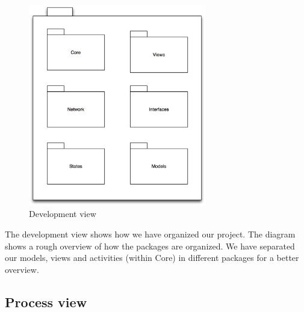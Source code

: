 \begin{figure}[H]
\begin{center}
\includegraphics[width=220pt]{./Images/DevelopmentView.png}
\end{center}
\caption{Development view}
\end{figure}

The development view shows how we have organized our project. The diagram shows a rough overview of how the packages are organized. We have separated our models, views and activities (within Core) in different packages for a better overview.

\pagebreak

\subsection{Process view}

